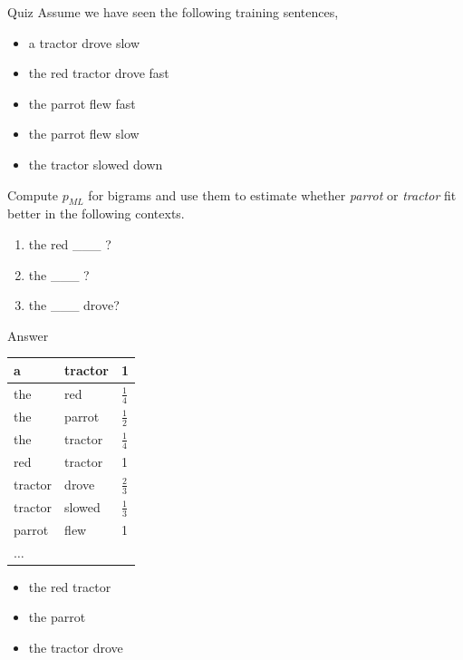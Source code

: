 \documentclass{beamer}
\begin{document}
\begin{frame}{Quiz}
  Assume we have seen the following training sentences, 

  \begin{itemize}
  \item     a tractor drove slow
  \item     the red tractor drove fast
  \item     the parrot flew fast

  \item the parrot flew slow
    
    \item the tractor slowed down

  \end{itemize}


  Compute $p_{ML}$ for bigrams and use them to estimate whether \textit{parrot} or \textit{tractor}  fit better in the following contexts.


  \begin{enumerate}
    \item the  red \_\_\_ ?
    \item the  \_\_\_ ?

    \item the  \_\_\_ drove?
  \end{enumerate}

\end{frame}



\begin{frame}[allowframebreaks]{Answer}
  \begin{table}
    \centering
    \begin{tabular}{lll}
      \toprule
      \midrule
      a & tractor & 1\\
      \midrule
      the & red & $\frac{1}{4}$\\
      the & parrot & $\frac{1}{2}$\\
      the & tractor &$\frac{1}{4}$ \\
      \midrule
      red & tractor & 1 \\
      \midrule
      tractor & drove & $\frac{2}{3}$ \\
      tractor & slowed & $\frac{1}{3}$ \\
      \midrule
      parrot & flew & 1 \\
      $\ldots$ & & \\
      \bottomrule
    \end{tabular}
  \end{table}

\newpage
  \begin{itemize}
  \item the red tractor 
  \item the parrot 
  \item the tractor drove 
  \end{itemize}
  

\end{frame}
\end{document}

